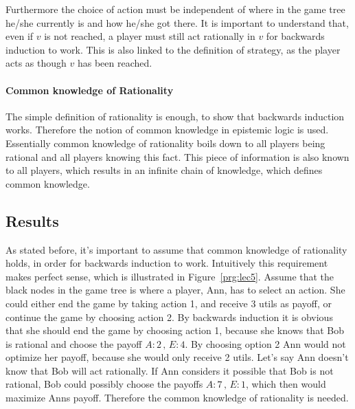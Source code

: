 Furthermore the choice of action must be independent of where in the game tree he/she currently is and how he/she got there.
It is important to understand that, even if $v$ is not reached, a player must still act rationally in $v$ for backwards induction to work. This is also linked to the definition of strategy, as the player acts as though $v$ has been reached.

\paragraph*{Common knowledge of Rationality} The simple definition of rationality is enough, to show that backwards induction works. Therefore the notion of common knowledge in epistemic logic is used. 
Essentially common knowledge of rationality boils down to all players being rational and all players knowing this fact. This piece of information is also known to all players, which results in an infinite chain of knowledge, which defines common knowledge. 

\subsection{Results}
As stated before, it's important to assume that common knowledge of rationality holds, in order for backwards induction to work.
Intuitively this requirement makes perfect sense, which is illustrated in Figure~\ref{prg:lec5}.
Assume that the black nodes in the game tree is where a player, Ann, has to select an action. She could either end the game by taking action 1, and receive 3 utils as payoff, or continue the game by choosing action 2. By backwards induction it is obvious that she should end the game by choosing action 1, because she knows that Bob is rational and choose the payoff $A:2 \, ,\, E:4$. By choosing option 2 Ann would not optimize her payoff, because she would only receive 2 utils. Let's say Ann doesn't know that Bob will act rationally. If Ann considers it possible that Bob is not rational, Bob could possibly choose the payoffs $A:7 \, ,\, E:1$, which then would maximize Anns payoff. Therefore the common knowledge of rationality is needed.


